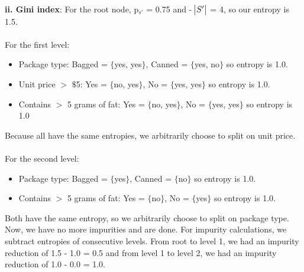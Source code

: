 \documentclass[12 pt]{article}
\begin{document}
	
	\noindent\textbf{ii. Gini index}:  For the root node, p$_{s'}$ = 0.75 and - $\abs{S'}$ = 4, so our entropy is 1.5. \\ \\
	For the first level: 
	\begin{itemize}
		\item Package type: Bagged = $\{$yes, yes$\}$, Canned = $\{$yes, no$\}$ so entropy is 1.0.
		\item Unit price $>$ $\$$5: Yes = $\{$no, yes$\}$, No = $\{$yes, yes$\}$ so entropy is 1.0.
		\item Contains $>$ 5 grams of fat: Yes = $\{$no, yes$\}$, No = $\{$yes, yes$\}$ so entropy is 1.0
	\end{itemize}
	Because all have the same entropies, we arbitrarily choose to split on unit price.  \\ \\
	
	For the second level: 
	\begin{itemize}
		\item Package type: Bagged = $\{$yes$\}$, Canned = $\{$no$\}$ so entropy is 1.0.
		\item Contains $>$ 5 grams of fat: Yes = $\{$no$\}$, No = $\{$yes$\}$ so entropy is 1.0.
	\end{itemize}
	Both have the same entropy, so we arbitrarily choose to split on package type. Now, we have no more impurities and are done. For impurity calculations, we subtract entropies of consecutive levels. From root to level 1, we had an impurity reduction of 1.5 - 1.0 = 0.5 and from level 1 to level 2, we had an impurity reduction of 1.0 - 0.0 = 1.0. 
	
\end{document}
